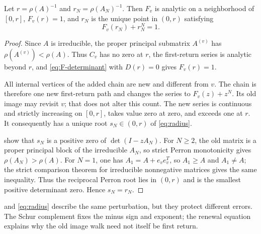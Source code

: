 \begin{proposition}
\label{prop:radius}
Let $r=\rho(A)^{-1}$ and $r_N=\rho(A_N)^{-1}$.  Then $F_v$ is analytic on a
neighborhood of $[0,r]$, $F_v(r)=1$, and $r_N$ is the unique point in
$(0,r)$ satisfying
\begin{equation}
 F_v(r_N)+r_N^N=1.
 \label{eq:radius}
\end{equation}
\end{proposition}

\begin{proof}
Since $A$ is irreducible, the proper principal submatrix $A^{(v)}$ has
$\rho(A^{(v)})<\rho(A)$.  Thus $C_v$ has no zero at $r$, the first-return
series is analytic beyond $r$, and \cref{eq:F-determinant} with $D(r)=0$
gives $F_v(r)=1$.

All internal vertices of the added chain are new and different from $v$.
The chain is therefore one new first-return path and changes the series to
$F_v(z)+z^N$.  Its old image may revisit $v$; that does not alter this count.
The new series is continuous and strictly increasing on $[0,r]$, takes value
zero at zero, and exceeds one at $r$.  It consequently has a unique root
$s_N\in(0,r)$ of \cref{eq:radius}.

 show that $s_N$ is a
positive zero of $\det(I-zA_N)$.  For $N\ge2$, the old matrix is a proper
principal block of the irreducible $A_N$, so strict Perron monotonicity gives
$\rho(A_N)>\rho(A)$.  For $N=1$, one has
$A_1=A+e_ve_v^T$, so $A_1\ge A$ and $A_1\ne A$; the strict comparison
theorem for irreducible nonnegative matrices gives the same inequality.  Thus the
reciprocal Perron root lies in $(0,r)$ and is the smallest positive
determinant zero.  Hence $s_N=r_N$.
\end{proof}

\begin{remark}
 and \cref{eq:radius} describe the same perturbation,
but they protect different errors.  The Schur complement fixes the minus sign
and exponent; the renewal equation explains why the old image walk need not
itself be first return.
\end{remark}

